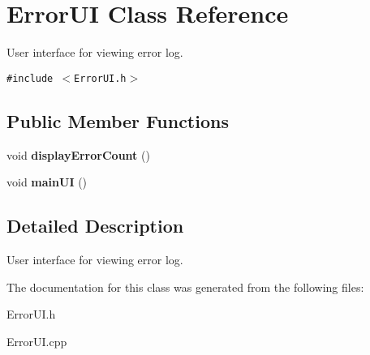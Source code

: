 \hypertarget{class_error_u_i}{
\section{Error\-UI Class Reference}
\label{class_error_u_i}
}
User interface for viewing error log.  


{\tt \#include $<$Error\-UI.h$>$}

\subsection*{Public Member Functions}
\begin{CompactItemize}
\item 
\hypertarget{class_error_u_i_c220b0cf73dd91d6e72ec18ed4817496}{
void {\bf display\-Error\-Count} ()}
\label{class_error_u_i_c220b0cf73dd91d6e72ec18ed4817496}

\item 
\hypertarget{class_error_u_i_3c76ebf8f201727c96b59855cb91ddf1}{
void {\bf main\-UI} ()}
\label{class_error_u_i_3c76ebf8f201727c96b59855cb91ddf1}

\end{CompactItemize}


\subsection{Detailed Description}
User interface for viewing error log. 



The documentation for this class was generated from the following files:\begin{CompactItemize}
\item 
Error\-UI.h\item 
Error\-UI.cpp\end{CompactItemize}
